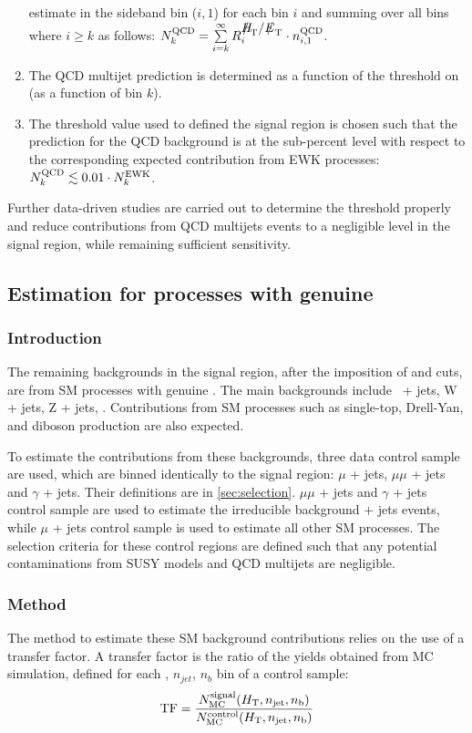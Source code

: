 \begin{enumerate}
  estimate in the \mhtmet sideband bin ($i,1$) for each bin $i$ and
  summing over all bins where $i \geq k$ as follows: $N^{\rm QCD}_{k}
  = \sum\limits^{\infty}_{i=k} R_{i}^{\mhtmet} \cdot n^{\rm
    QCD}_{i,1}$.
\item The QCD multijet prediction is determined as a function of the
  threshold on \alphat (\ie as a function of bin $k$).
\item The \alphat threshold value used to defined the signal region is
  chosen such that the prediction for the QCD background is at the
  sub-percent level with respect to the corresponding expected
  contribution from EWK processes: $N^{\rm QCD}_{k} \lesssim 0.01
  \cdot N^{\rm EWK}_{k}$.
\end{enumerate}

Further data-driven studies are carried out to determine the \alphat threshold properly and reduce contributions from QCD multijets events to a negligible level in the signal region, while remaining sufficient sensitivity.

\subsection{Estimation for processes with genuine \met}
\subsubsection{Introduction}
The remaining backgrounds in the signal region, after the imposition of \alphat and \mhtmet cuts, are from SM processes with genuine \met. The main backgrounds include \znunu\ + jets, W + jets, Z + jets, \ttbar. Contributions from SM processes such as single-top, Drell-Yan, and diboson production are also expected.

To estimate the contributions from these backgrounds, three data control sample are used, which are binned identically to the signal region: $\mu$ + jets, $\mu\mu$ + jets and $\gamma$ + jets. Their definitions are in \ref{sec:selection}. $\mu\mu$ + jets and $\gamma$ + jets control sample are used to estimate the irreducible background \znunu + jets events, while $\mu$ + jets control sample is used to estimate all other SM processes. The selection criteria for these control regions are defined such that any potential contaminations from SUSY models and QCD multijets are negligible.


\subsubsection{Method}
\label{sec:ewk-method}
The method to estimate these SM background contributions relies on the use of a transfer factor. A transfer factor is the ratio of the yields obtained from MC simulation, defined for each \scalht, $n_{jet}$, $n_b$ bin of a control sample:
\begin{equation}
  \label{equ:tf-ratio}
  {\rm TF} = \frac{N_{\rm MC}^{\rm signal}(\mbox{$H_\text{T}$},n_{\text{jet}},n_{\text{b}})}{N_{\rm
      MC}^{\rm control}(\mbox{$H_\text{T}$},n_{\text{jet}},n_{\text{b}})} 
\end{equation}

